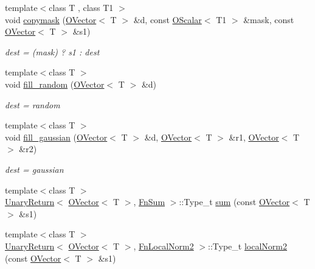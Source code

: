 \begin{DoxyCompactItemize}
{\footnotesize template$<$class T , class T1 $>$ }\\void \mbox{\hyperlink{group__obsvector_ga36fbe4267e04acd96a7558ca09b16912}{copymask}} (\mbox{\hyperlink{classENSEM_1_1OVector}{O\+Vector}}$<$ T $>$ \&d, const \mbox{\hyperlink{classENSEM_1_1OScalar}{O\+Scalar}}$<$ T1 $>$ \&mask, const \mbox{\hyperlink{classENSEM_1_1OVector}{O\+Vector}}$<$ T $>$ \&s1)
\begin{DoxyCompactList}\small\item\em dest = (mask) ? s1 \+: dest \end{DoxyCompactList}\item 
{\footnotesize template$<$class T $>$ }\\void \mbox{\hyperlink{group__obsvector_ga1ba77da0ffafb0320b14d1dd9fa47179}{fill\+\_\+random}} (\mbox{\hyperlink{classENSEM_1_1OVector}{O\+Vector}}$<$ T $>$ \&d)
\begin{DoxyCompactList}\small\item\em dest = random \end{DoxyCompactList}\item 
{\footnotesize template$<$class T $>$ }\\void \mbox{\hyperlink{group__obsvector_ga0830d11c7cf74530fe40c56bc99ceb29}{fill\+\_\+gaussian}} (\mbox{\hyperlink{classENSEM_1_1OVector}{O\+Vector}}$<$ T $>$ \&d, \mbox{\hyperlink{classENSEM_1_1OVector}{O\+Vector}}$<$ T $>$ \&r1, \mbox{\hyperlink{classENSEM_1_1OVector}{O\+Vector}}$<$ T $>$ \&r2)
\begin{DoxyCompactList}\small\item\em dest = gaussian \end{DoxyCompactList}\item 
{\footnotesize template$<$class T $>$ }\\\mbox{\hyperlink{structENSEM_1_1UnaryReturn}{Unary\+Return}}$<$ \mbox{\hyperlink{classENSEM_1_1OVector}{O\+Vector}}$<$ T $>$, \mbox{\hyperlink{structENSEM_1_1FnSum}{Fn\+Sum}} $>$\+::Type\+\_\+t \mbox{\hyperlink{group__obsvector_gaea84ad793fea0a58204b33a7bcee51b4}{sum}} (const \mbox{\hyperlink{classENSEM_1_1OVector}{O\+Vector}}$<$ T $>$ \&s1)
\item 
{\footnotesize template$<$class T $>$ }\\\mbox{\hyperlink{structENSEM_1_1UnaryReturn}{Unary\+Return}}$<$ \mbox{\hyperlink{classENSEM_1_1OVector}{O\+Vector}}$<$ T $>$, \mbox{\hyperlink{structENSEM_1_1FnLocalNorm2}{Fn\+Local\+Norm2}} $>$\+::Type\+\_\+t \mbox{\hyperlink{group__obsvector_ga84dbc523abff754a5ecdd0658eb687e1}{local\+Norm2}} (const \mbox{\hyperlink{classENSEM_1_1OVector}{O\+Vector}}$<$ T $>$ \&s1)

\end{DoxyCompactItemize}
